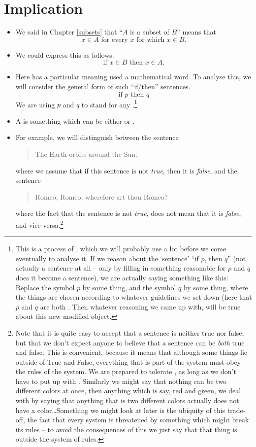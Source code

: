 \chapter{Implication}
\label{implication}

\begin{itemize}
\item
We said in Chapter \ref{subsets} that ``$A$ is a subset of $B$'' means that
\[  x \in A \text{ for every } x \text{ for which } x \in B .\]
\item
We could express this as follows:
\[ \text{if } x \in B \text{ then } x \in A .\]
\item
Here  has a particular meaning used a mathematical word. To analyse this, we will consider the general form of such ``if/then'' sentences.
\[ \text{if } p \text{ then } q \]
We are using $p$ and $q$ to stand for any .\footnote{This is a process of , which we will probably use a lot before we come eventually to analyse it. If we reason about the `sentence' ``if $p$, then $q$'' (not actually a sentence at all -- only by filling in something reasonable for $p$ and $q$ does it become a sentence), we are actually saying something like this: Replace the symbol $p$ by some thing, and the symbol $q$ by some thing, where the things are chosen according to whatever guidelines we set down (here that $p$ and $q$ are both . Then whatever reasoning we came up with, will be true about this new modified object.}
\item
 A  is something which can be either  or .
\item
For example, we will distinguish between the sentence
\begin{quote}
The Earth orbits around the Sun.
\end{quote}
where we assume that if this sentence is not \emph{true}, then it is \emph{false}, and the sentence
\begin{quote}
Romeo, Romeo, wherefore art thou Romeo?
\end{quote}
where the fact that the sentence is not \emph{true}, does not mean that it is \emph{false}, and vice versa.\footnote{Note that it is quite easy to accept that a sentence is neither true nor false, but that we don't expect anyone to believe that a sentence can be \emph{both} true and false. This is convenient, because it means that although some things lie outside of True and False, everything that is part of the system must obey the rules of the system. We are prepared to tolerate , as long as we don't have to put up with . Similarly we might say that nothing can be two different colors at once, then anything which is say, red and green, we deal with by saying that anything that is two different colors actually does not have a color\ldots Something we might look at later is the ubiquity of this trade-off, the fact that every system is threatened by something which might break its rules -- to avoid the consequences of this we just say that that thing is outside the system of rules.}

\end{itemize}
